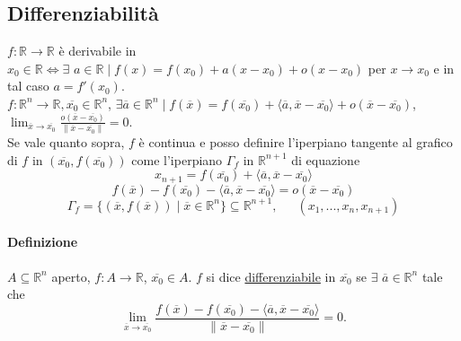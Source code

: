 \documentclass{article}
\newcommand{\R}{\mathbb{R}}
\begin{document}
\subsection{Differenziabilità}
$f:\R\rightarrow\R$ è derivabile in $x_0\in \R \Leftrightarrow \exists \,\, a \in \R \mid f(x)=f(x_0)+a(x-x_0)+o(x-x_0)$ per $x \rightarrow x_0$ e in tal caso $a=f'(x_0)$.\\
$f:\R^n\rightarrow\R, \overline{x_0}\in\R^n$, $\exists\overline{a}\in\R^n \mid f(\overline{x})=f(\overline{x_0})+ \langle \overline{a},\overline{x}-\overline{x_0} \rangle +o(\overline{x}-\overline{x_0})$, $\lim_{\overline{x}\rightarrow\overline{x_0}}\frac{o(\overline{x}-\overline{x_0})}{\|\overline{x}-\overline{x_0}\|}=0$.\\
Se vale quanto sopra, $f$ è continua e posso definire l'iperpiano tangente al grafico di $f$ in $(\overline{x_0},f(\overline{x_0}))$ come l'iperpiano $\Gamma_f$ in $\R^{n+1}$ di equazione
\begin{equation*}
    x_{n+1}=f(\overline{x_0})+\langle \overline{a},\overline{x}-\overline{x_0}\rangle
\end{equation*}
\begin{equation*}
    f(\overline{x})-f(\overline{x_0})-\langle \overline{a},\overline{x}-\overline{x_0} \rangle=o(\overline{x}-\overline{x_0})
\end{equation*}
\begin{equation*}
    \Gamma_f=\{(\overline{x},f(\overline{x}))\mid \overline{x} \in \R^n\}\subseteq\R^{n+1},\,\,\,\,\,\,\,\,\,(x_1,...,x_n,x_{n+1})
\end{equation*}

\paragraph{{Definizione}}
$A\subseteq\R^n$ aperto, $f:A\rightarrow \R$, $\overline{x_0}\in A$. $f$ si dice \underline{differenziabile} in $\overline{x_0}$ se $\exists\,\, \overline{a}\in \R^n$ tale che
\begin{equation*}
    \lim_{\overline{x}\rightarrow\overline{x_0}}\frac{f(\overline{x})-f(\overline{x_0})-\langle \overline{a},\overline{x}-\overline{x_0}\rangle}{\|\overline{x}-\overline{x_0}\|}=0.
\end{equation*}
\end{document}
